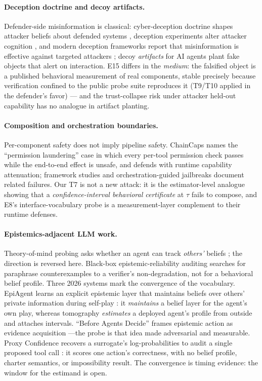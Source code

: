 \documentclass[10pt,twocolumn]{article}
\begin{document}
\paragraph{Deception doctrine and decoy artifacts.}
Defender-side misinformation is classical: cyber-deception doctrine shapes
attacker beliefs about defended systems \cite{bodeau2013}, deception
experiments alter attacker cognition \cite{fergusonwalter2017}, and modern
deception frameworks report that misinformation is effective against targeted
attackers \cite{perry2025}; decoy \emph{artifacts} for AI agents
\cite{honeypotagents2026} plant fake objects that alert on interaction. E15
differs in the \emph{medium}: the falsified object is a published behavioral
measurement of real components, stable precisely because verification confined
to the public probe suite reproduces it (T9/T10 applied in the defender's
favor) --- and the trust-collapse risk under attacker held-out capability has
no analogue in artifact planting.

\paragraph{Composition and orchestration boundaries.}
Per-component safety does not imply pipeline safety. ChainCaps \cite{chaincaps2026}
names the ``permission laundering'' case in which every per-tool permission
check passes while the end-to-end effect is unsafe, and defends with runtime
capability attenuation; framework studies \cite{orchestration2026} and
orchestration-guided jailbreaks \cite{orchjail2026} document related failures.
Our T7 is not a new attack: it is the estimator-level analogue showing that a
\emph{confidence-interval behavioral certificate} at $\tau$ fails to compose,
and E8's interface-vocabulary probe is a measurement-layer complement to their
runtime defenses.

\paragraph{Epistemics-adjacent LLM work.}
Theory-of-mind probing asks whether an agent can track \emph{others'} beliefs
\cite{strachan2024}; the direction is reversed here. Black-box epistemic-reliability
auditing \cite{eraudit} searches for paraphrase counterexamples to a verifier's
non-degradation, not for a behavioral belief profile. Three 2026 systems mark the
convergence of the vocabulary. EpiAgent learns an explicit epistemic layer that
maintains beliefs over others' private information during self-play
\cite{epiagent}: it \emph{maintains} a belief layer for the agent's own play,
whereas tomography \emph{estimates} a deployed agent's profile from outside and
attaches intervals. ``Before Agents Decide'' frames epistemic action as evidence
acquisition \cite{beforedecide}---the probe is that idea made adversarial and
measurable. Proxy Confidence recovers a surrogate's log-probabilities to audit a
single proposed tool call \cite{proxyconfidence}: it scores one action's
correctness, with no belief profile, charter semantics, or impossibility result.
The convergence is timing evidence: the window for the estimand is open.
\end{document}
